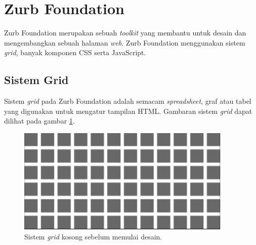 \section{Zurb Foundation}
\label{sec:zurbfoundation}
%

Zurb Foundation \cite{zurbfoundationbook} merupakan sebuah \textit{toolkit} yang membantu untuk desain dan mengembangkan sebuah halaman \textit{web}. Zurb Foundation menggunakan sistem \textit{grid}, banyak komponen CSS serta JavaScript. 

\subsection{Sistem Grid}
Sistem \textit{grid} pada Zurb Foundation adalah semacam \textit{spreadsheet}, graf atau tabel yang digunakan untuk mengatur tampilan HTML. Gambaran sistem \textit{grid} dapat dilihat pada gambar \ref{fig:2_zurb_grid_blank}.

\begin{figure}[H]
	\centering
	\includegraphics[scale=0.5]{Gambar/zurb-gridblank}
	\caption{Sistem \textit{grid} kosong sebelum memulai desain.} 
	\label{fig:2_zurb_grid_blank}
\end{figure}

